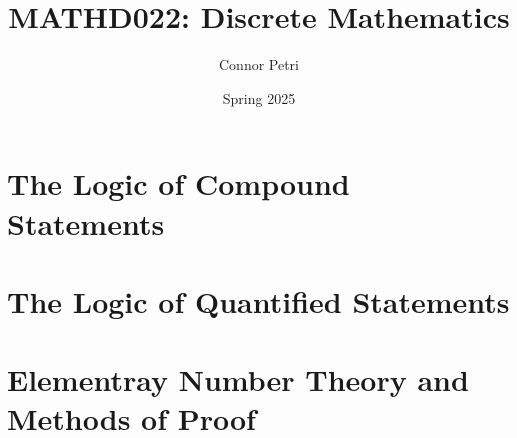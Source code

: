 \documentclass[12pt, letterpaper]{article}
\title{MATHD022: Discrete Mathematics}
\author{Connor Petri}
\date{Spring 2025}
\begin{document}
\maketitle
\pagebreak
\tableofcontents
\pagebreak





\section{The Logic of Compound Statements}




\section{The Logic of Quantified Statements}





\section{Elementray Number Theory and Methods of Proof}

\end{document}
